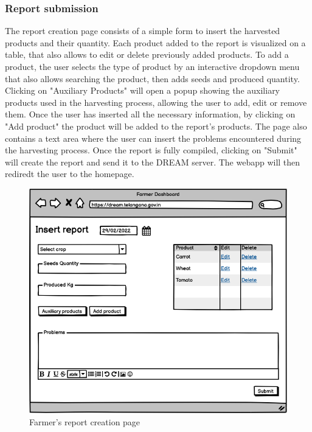 \documentclass[10pt]{article} %
\begin{document}
\subsubsection{Report submission}
The report creation page consists of a simple form to insert the harvested products and their quantity. Each product added to the report is visualized 
on a table, that also allows to edit or delete previously added products. To add a product, the user selects the type of product by an interactive dropdown
menu that also allows searching the product, then adds seeds and produced quantity. Clicking on "Auxiliary Products" will open a popup showing the auxiliary
products used in the harvesting process, allowing the user to add, edit or remove them. Once the user has inserted all the necessary information, by clicking on "Add product"
the product will be added to the report's products. The page also contains a text area where the user can insert the problems encountered during the harvesting process. 
Once the report is fully compiled, clicking on "Submit" will create the report and send it to the DREAM server. The webapp will then rediredt the user to the homepage. \\
\begin{figure}[h]
    \centering
    \centerline{\includegraphics[scale=0.54]{images/uimockups/f_report.png}}
    \caption{Farmer's report creation page}
    \label{fig:ui_f_report}
\end{figure}
\newpage
\end{document}
